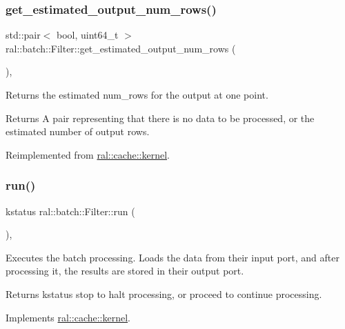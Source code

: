 \subsubsection{\texorpdfstring{get\+\_\+estimated\+\_\+output\+\_\+num\+\_\+rows()}{get\_estimated\_output\_num\_rows()}}
{\footnotesize\ttfamily std\+::pair$<$ bool, uint64\+\_\+t $>$ ral\+::batch\+::\+Filter\+::get\+\_\+estimated\+\_\+output\+\_\+num\+\_\+rows (\begin{DoxyParamCaption}{ }\end{DoxyParamCaption})\hspace{0.3cm}{\ttfamily [override]}, {\ttfamily [virtual]}}

Returns the estimated num\+\_\+rows for the output at one point. \begin{DoxyReturn}{Returns}
A pair representing that there is no data to be processed, or the estimated number of output rows. 
\end{DoxyReturn}


Reimplemented from \hyperlink{classral_1_1cache_1_1kernel_abf40aaa022e3bf38c261977d0c2170cb}{ral\+::cache\+::kernel}.

\mbox{\label{classral_1_1batch_1_1Filter_acae535218dc139f0db24b80cb39353c2}} 
\subsubsection{\texorpdfstring{run()}{run()}}
{\footnotesize\ttfamily kstatus ral\+::batch\+::\+Filter\+::run (\begin{DoxyParamCaption}{ }\end{DoxyParamCaption})\hspace{0.3cm}{\ttfamily [override]}, {\ttfamily [virtual]}}

Executes the batch processing. Loads the data from their input port, and after processing it, the results are stored in their output port. \begin{DoxyReturn}{Returns}
kstatus \textquotesingle{}stop\textquotesingle{} to halt processing, or \textquotesingle{}proceed\textquotesingle{} to continue processing. 
\end{DoxyReturn}


Implements \hyperlink{classral_1_1cache_1_1kernel_a735b081cccae9574924e74ea6d293ef7}{ral\+::cache\+::kernel}.

